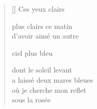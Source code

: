 \documentclass[12pt,a4paper]{article}
\begin{document}

\newpage

\poemtitle{}

\settowidth{\versewidth}{où je cherche mon reflet}

\bigskip

\begin{verse}[\versewidth]
  Ces yeux clairs

  plus clairs ce matin \\
  d'avoir aimé un autre

  ciel plus bleu

  dont le soleil levant \\
  a laissé deux mares bleues \\
  où je cherche mon reflet \\
  sous la rosée
\end{verse}


\newpage

\poemtitle{}

\settowidth{\versewidth}{to the necklaces of their laughter}

\bigskip
\end{document}
